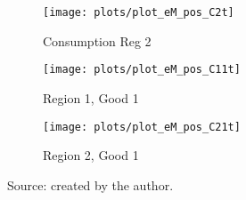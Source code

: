\documentclass[../thesis.tex]{subfiles}
\begin{document}
\begin{figure}[h!]
		\vspace*{0.1cm}
		\begin{subfigure}[b]{0.27\textwidth}
			\centering
			\texttt{[image: plots/plot\_eM\_pos\_C2t]}
			\caption{\scriptsize Consumption Reg 2}
			\label{fig:ZMt-C2t}
		\end{subfigure}
		\hspace*{0.5cm}
		\begin{subfigure}[b]{0.27\textwidth}
			\centering
			\texttt{[image: plots/plot\_eM\_pos\_C11t]}
			\caption{\scriptsize Region 1, Good 1}
			\label{fig:ZMt-C11t}
		\end{subfigure}
		\hspace*{0.5cm}
		\begin{subfigure}[b]{0.27\textwidth}
			\centering
			\texttt{[image: plots/plot\_eM\_pos\_C21t]}
			\caption{\scriptsize Region 2, Good 1}
			\label{fig:ZMt-C21t}
		\end{subfigure}
		\caption*{Source: created by the author.}
		\label{fig:ZMt-irf}
	\end{figure}


\newpage
\end{document}
